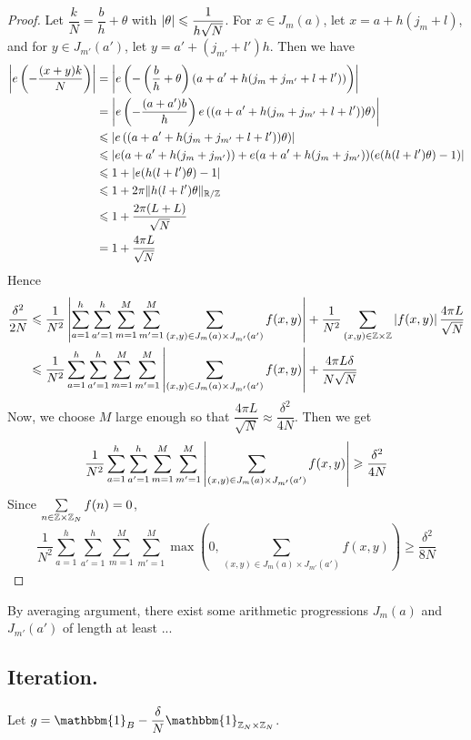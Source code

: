 \begin{proof}
	Let $ \dfrac{k}{N} = \dfrac{b}{h} + \theta $ with $ \left\vert{\theta}\right\vert \leqslant \dfrac{1}{h\sqrt{N}} $. For $ x \in J_m(a) $, let $ x = a + h(j_m + l) $, and for $ y \in J_{m'}(a') $, let $ y = a' + (j_{m'} + l')h $. Then we have
	\begin{align*}
	\left\vert{e\left(-\dfrac{(x+y)k}{N}\right)}\right\vert 
	&= \left\vert{e\left(- \left( \dfrac{b}{h} + \theta \right) (a + a' + h(j_m + j_{m'} + l + l'))\right)}\right\vert 	 \\
	& = \left\vert{e\left( -\dfrac{(a+a')b}{h}\right) e\left( (a + a' + h(j_m + j_{m'} + l + l')) \theta\right)}\right\vert \\
	& \leqslant \left\vert{ e\left( (a + a' + h(j_m + j_{m'} + l + l')) \theta\right)}\right\vert\\
	& \leqslant \left\vert{e(a+ a' + h(j_m +j_{m'})) + e(a+ a' + h(j_m +j_{m'})) (e(h(l+l')\theta) - 1)}\right\vert \\
	& \leqslant 1 + \left\vert{e(h(l+l')\theta) - 1}\right\vert  \\
	& \leqslant 1 + 2\pi  \| h(l+l')\theta \|_{{\mathbb R} /{\mathbb Z}} \\
	& \leqslant 1 + \dfrac{2 \pi  (L+L)} {\sqrt{N}} \\
	& = 1 + \dfrac{4 \pi L}{\sqrt{N}} 
	\end{align*}
	Hence
	\begin{align*}
	\dfrac{\delta^2}{2N} 
	&\leqslant \dfrac{1}{N^2}\left\vert{\sum\limits_{a = 1}^h \sum\limits_{a' = 1} ^h \sum\limits_{m = 1}^M \sum\limits_{m' = 1}^M \sum\limits_{(x,y) \in J_m(a) \times J_{m'}(a')} f(x,y)}\right\vert + \dfrac{1}{N^2} \sum\limits_{(x,y) \in {\mathbb Z} \times {\mathbb Z}} \left\vert{f(x,y)}\right\vert \dfrac{4 \pi L}{\sqrt{N}} \\
	& \leqslant  \dfrac{1}{N^2} \sum\limits_{a = 1}^h \sum\limits_{a' = 1} ^h \sum\limits_{m = 1}^M \sum\limits_{m' = 1}^M \left\vert{\sum\limits_{(x,y) \in J_m(a) \times J_{m'}(a')} f(x,y)}\right\vert + \dfrac{4 \pi L \delta}{N\sqrt{N}}	
	\end{align*}
	Now, we choose $ M $ large enough so that $ \dfrac{4 \pi L}{\sqrt{N}} \approx \dfrac{\delta^2}{4N} $. Then we get
	$$ \dfrac{1}{N^2}\sum\limits_{a = 1}^h \sum\limits_{a' = 1} ^h \sum\limits_{m = 1}^M \sum\limits_{m' = 1}^M \left\vert{\sum\limits_{(x,y) \in J_m(a) \times J_{m'}(a')} f(x,y)}\right\vert \geqslant \dfrac{\delta^2}{4N} $$
	Since $ \sum\limits_{n \in {\mathbb Z} \times {\mathbb Z}_N} f(n) = 0  $, 
	$$ \dfrac{1}{N^2}\sum\limits_{a = 1}^h \sum\limits_{a' = 1} ^h \sum\limits_{m = 1}^M \sum\limits_{m' = 1}^M \max \left(0, \sum\limits_{(x,y) \in J_m(a) \times J_{m'}(a')} f(x,y) \right) \geq \dfrac{\delta^2}{8N} $$
\end{proof}
	
	\noindent By averaging argument, there exist some arithmetic progressions $ J_m(a) $ and $ J_{m'}(a') $ of length at least ... 

\subsection{Iteration.}
Let $ g = \mathbbm{1}_B - \dfrac{\delta}{N} \mathbbm{1}_{\bbZ_N \times \bbZ_N} $. 

